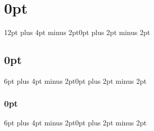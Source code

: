 \usepackage[english]{babel}
\usepackage{fancyhdr}
\usepackage{lastpage} 
\pagestyle{fancy}
\fancyhead[C]{}


\newcommand\EatDot[1]{}

\setlength{\parskip}{.5em}
\usepackage{titlesec}
\titlespacing\section{0pt}{12pt plus 4pt minus 2pt}{0pt plus 2pt minus 2pt}
\titlespacing\subsection{0pt}{6pt plus 4pt minus 2pt}{0pt plus 2pt minus 2pt}
\titlespacing\subsubsection{0pt}{6pt plus 4pt minus 2pt}{0pt plus 2pt minus 2pt}
\makeatletter \renewcommand\@biblabel[1]{} \makeatother  %
\usepackage{natbib}  %
\usepackage{float}
\usepackage{caption}

